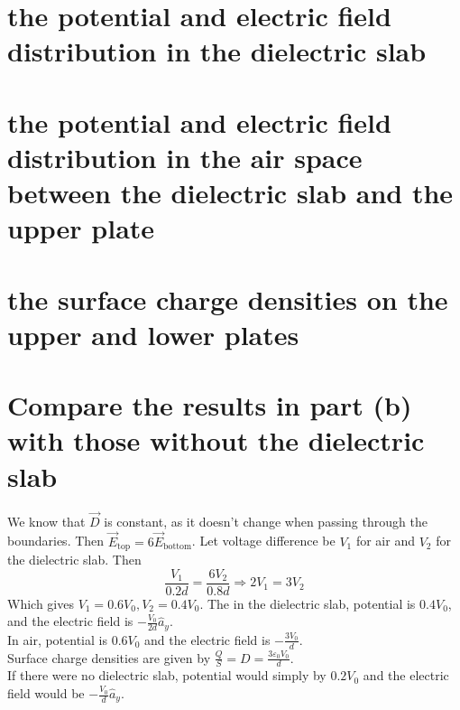 \documentclass[answers]{exam}
\begin{document}
\begin{questions}
\begin{parts}
    \part{the potential and electric field distribution in the dielectric slab}
    \part{the potential and electric field distribution in the air space between the dielectric slab and the upper plate}
    \part{the surface charge densities on the upper and lower plates}
    \part{Compare the results in part (b) with those without the dielectric slab}
\end{parts}

\begin{solution}
    We know that $\vec D$ is constant, as it doesn't change when passing through the boundaries. Then $\vec E_{\text{top}} = 6\vec E_{\text{bottom}}$. Let voltage difference be $V_1$ for air and $V_2$ for the dielectric slab. Then
    $$\frac{V_1}{0.2d} = \frac{6V_2}{0.8d} \Rightarrow 2V_1 = 3V_2$$
    Which gives $V_1 = 0.6V_0, V_2 = 0.4V_0$. The in the dielectric slab, potential is $0.4V_0$, and the electric field is $-\frac{V_0}{2d} \hat a_y$. \\
    In air, potential is $0.6V_0$ and the electric field is $-\frac{3V_0}{d}$. \\
    Surface charge densities are given by $\frac{Q}{S} = D = \frac{3\varepsilon_0V_0}{d}$. \\
    If there were no dielectric slab, potential would simply by $0.2V_0$ and the electric field would be $-\frac{V_0}{d} \hat a_y$.
\end{solution}


\begin{solution}
\end{solution}


\end{questions}
\end{document}
